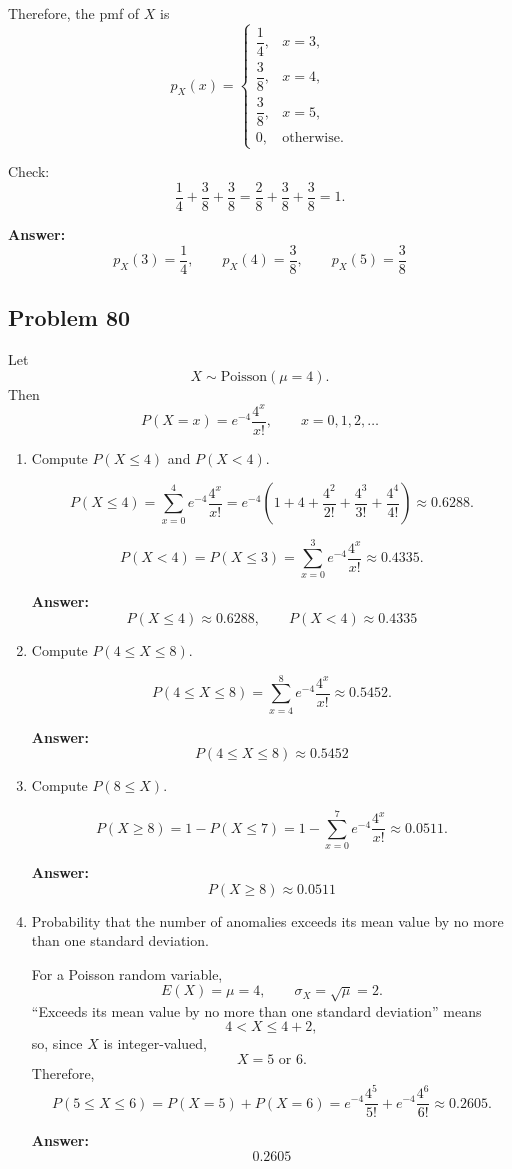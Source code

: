 \documentclass[11pt]{article}
\begin{document}
Therefore, the pmf of \(X\) is
\[
p_X(x)=
\begin{cases}
\dfrac14, & x=3,\\[6pt]
\dfrac38, & x=4,\\[6pt]
\dfrac38, & x=5,\\[6pt]
0, & \text{otherwise.}
\end{cases}
\]

Check:
\[
\frac14+\frac38+\frac38=\frac{2}{8}+\frac{3}{8}+\frac{3}{8}=1.
\]

\textbf{Answer:}
\[
\boxed{
p_X(3)=\frac14,\qquad
p_X(4)=\frac38,\qquad
p_X(5)=\frac38
}
\]

\subsection*{Problem 80}

Let
\[
X \sim \mathrm{Poisson}(\mu=4).
\]
Then
\[
P(X=x)=e^{-4}\frac{4^x}{x!}, \qquad x=0,1,2,\dots
\]

\begin{enumerate}
    \item[(a)] Compute \(P(X\le 4)\) and \(P(X<4)\).

    \[
    P(X\le 4)=\sum_{x=0}^{4} e^{-4}\frac{4^x}{x!}
    =e^{-4}\left(1+4+\frac{4^2}{2!}+\frac{4^3}{3!}+\frac{4^4}{4!}\right)
    \approx 0.6288.
    \]

    \[
    P(X<4)=P(X\le 3)=\sum_{x=0}^{3} e^{-4}\frac{4^x}{x!}
    \approx 0.4335.
    \]

    \textbf{Answer:}
    \[
    \boxed{P(X\le 4)\approx 0.6288,\qquad P(X<4)\approx 0.4335}
    \]

    \item[(b)] Compute \(P(4\le X\le 8)\).

    \[
    P(4\le X\le 8)=\sum_{x=4}^{8} e^{-4}\frac{4^x}{x!}
    \approx 0.5452.
    \]

    \textbf{Answer:}
    \[
    \boxed{P(4\le X\le 8)\approx 0.5452}
    \]

    \item[(c)] Compute \(P(8\le X)\).

    \[
    P(X\ge 8)=1-P(X\le 7)
    =1-\sum_{x=0}^{7} e^{-4}\frac{4^x}{x!}
    \approx 0.0511.
    \]

    \textbf{Answer:}
    \[
    \boxed{P(X\ge 8)\approx 0.0511}
    \]

    \item[(d)] Probability that the number of anomalies exceeds its mean value by no more than one standard deviation.

    For a Poisson random variable,
    \[
    E(X)=\mu=4,\qquad \sigma_X=\sqrt{\mu}=2.
    \]
    “Exceeds its mean value by no more than one standard deviation” means
    \[
    4<X\le 4+2,
    \]
    so, since \(X\) is integer-valued,
    \[
    X=5 \text{ or } 6.
    \]
    Therefore,
    \[
    P(5\le X\le 6)=P(X=5)+P(X=6)
    =e^{-4}\frac{4^5}{5!}+e^{-4}\frac{4^6}{6!}
    \approx 0.2605.
    \]

    \textbf{Answer:}
    \[
    \boxed{0.2605}
    \]
\end{enumerate}
\end{document}
